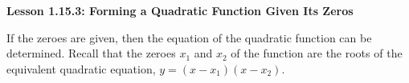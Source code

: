 \begin{center}
\textbf{Lesson 1.15.3: Forming a Quadratic Function Given Its Zeros}
\end{center}


If the zeroes are given, then the equation of the quadratic function can be determined. Recall that the zeroes $x_1$ and $x_2$ of the function are the roots of the equivalent quadratic equation, $y = (x - x_1) (x - x_2) $. 


